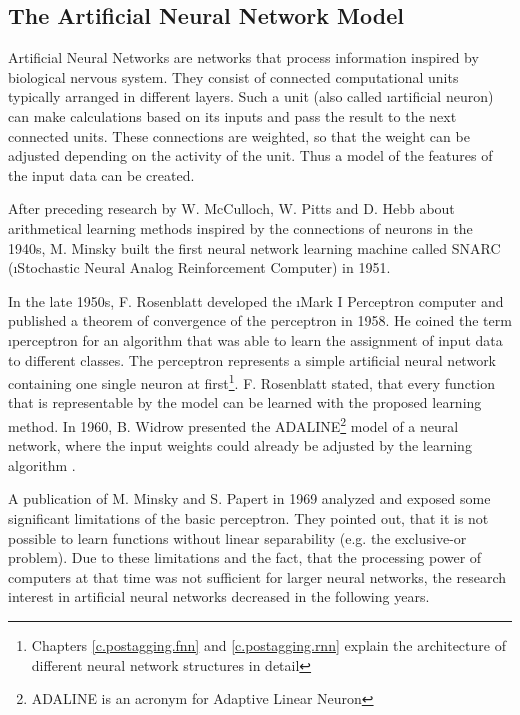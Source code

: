 
\subsection{The Artificial Neural Network Model}\label{c.introduction.related.nn}
Artificial Neural Networks are networks that process information inspired by biological nervous system. They consist of connected computational units typically arranged in different layers. Such a unit (also called \i{artificial neuron}) can make calculations based on its inputs and pass the result to the next connected units. These connections are weighted, so that the weight can be adjusted depending on the activity of the unit. Thus a model of the features of the input data can be created.

After preceding research by W. McCulloch, W. Pitts \cite{mcculloch1943} and D. Hebb \cite{shaw1986} about arithmetical learning methods inspired by the connections of neurons in the 1940s, M. Minsky built the first neural network learning machine called SNARC (\i{Stochastic Neural Analog Reinforcement Computer)}\cite{crevier1993} in 1951.

In the late 1950s, F. Rosenblatt developed the \i{Mark I Perceptron} computer and published a theorem of convergence of the perceptron\cite{rosenblatt1958} in 1958. He coined the term \i{perceptron} for an algorithm that was able to learn the assignment of input data to different classes. The perceptron represents a simple artificial neural network containing one single neuron at first\footnote{Chapters \ref{c.postagging.fnn} and \ref{c.postagging.rnn} explain the architecture of different neural network structures in detail}. F. Rosenblatt stated, that every function that is representable by the model can be learned with the proposed learning method. In 1960, B. Widrow presented the ADALINE\footnote{ADALINE is an acronym for Adaptive Linear Neuron} model of a neural network, where the input weights could already be adjusted by the learning algorithm \cite{widrow1960}.

A publication of M. Minsky and S. Papert \cite{minsky1969} in 1969 analyzed and exposed some significant limitations of the basic perceptron. They pointed out, that it is not possible to learn functions without linear separability (e.g. the exclusive-or problem). Due to these limitations and the fact, that the processing power of computers at that time was not sufficient for larger neural networks, the research interest in artificial neural networks decreased in the following years.

